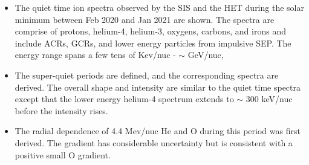 \begin{itemize}
    \item The quiet time ion spectra observed by the \ac{SIS} and the \ac{HET} during the solar minimum between Feb 2020 and Jan 2021 are shown. The spectra are comprise of protons, helium-4, helium-3, oxygens, carbons, and irons and include \acp{ACR}, \acp{GCR}, and lower energy particles from impulsive \ac{SEP}. The energy range spans a few tens of Kev/nuc - $\sim$ GeV/nuc,
    \item The super-quiet periods are defined, and the corresponding spectra are derived. The overall shape and intensity are similar to the quiet time spectra except that the lower energy helium-4 spectrum extends to $\sim$ 300 keV/nuc before the intensity rises.
    \item The radial dependence of 4.4 Mev/nuc He and O during this period was first derived. The gradient has considerable uncertainty but is consistent with a positive small O gradient.
\end{itemize}


